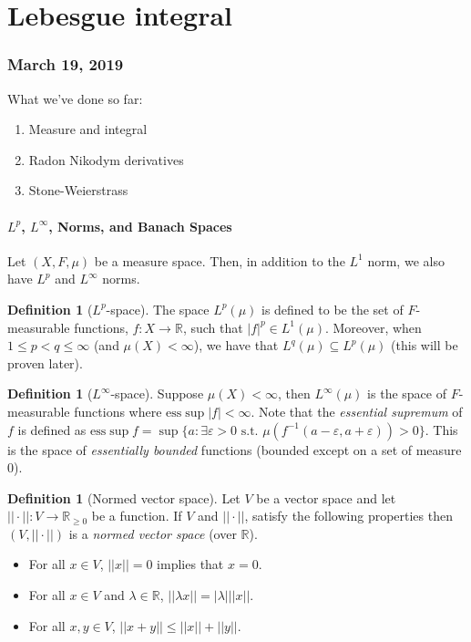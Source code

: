 \documentclass{article}
\theoremstyle{definition}
\newtheorem{definition}[theorem]{Definition}
\begin{document}
\part{Lebesgue integral}

\section{March 19, 2019}

What we've done so far:
\begin{enumerate}
    \item Measure and integral
    \item Radon Nikodym derivatives
    \item Stone-Weierstrass
\end{enumerate}

\subsection{\( L^p \), \( L^\infty \), Norms, and Banach Spaces}

Let \((X,F,\mu)\) be a measure space. Then, in addition to the \(L^1\) norm, we also have \(L^p\) and \(L^\infty \)
norms.

\begin{definition}[\(L^p\)-space]
    The space \(L^p(\mu)\) is defined to be the set of \(F\)-measurable functions, \(f:X\rightarrow\mathbb{R} \), such that
    \(|f|^p\in L^1(\mu)\). Moreover, when \(1\leq p<q\leq\infty \) (and \(\mu(X)<\infty \)), we have that
    \(L^q(\mu)\subseteq L^p(\mu)\) (this will be proven later).
\end{definition}

\begin{definition}[\(L^\infty \)-space]
    Suppose \(\mu(X)<\infty \), then \(L^\infty(\mu)\) is the space of \(F\)-measurable functions where
    \(\text{ess}\sup |f|<\infty \). Note that the \textit{essential supremum} of \(f\) is defined as
    \(\text{ess}\sup f=\sup \{a:\exists\varepsilon>0\text{ s.t. } \mu(f^{-1}(a-\varepsilon,a+\varepsilon))>0\} \).
    This is the space of \textit{essentially bounded} functions (bounded except on a set of measure 0).
\end{definition}

\begin{definition}[Normed vector space]
    Let \(V\) be a vector space and let \(||\cdot||:V\rightarrow\mathbb{R}_{\geq0}\) be a function. If \(V\) and \(||\cdot||\),
    satisfy the following properties then \((V,||\cdot||)\) is a \textit{normed vector space} (over \(\mathbb{R} \)). 
    \begin{itemize}
        \item For all \(x\in V\), \(||x||=0\) implies that \(x=0\).
        \item For all \(x\in V\) and \(\lambda\in\mathbb{R} \), \(||\lambda x||=|\lambda| ||x||\).
        \item For all \(x,y\in V\), \(||x+y||\leq ||x||+||y||\).
    \end{itemize}
\end{definition}
\end{document}
